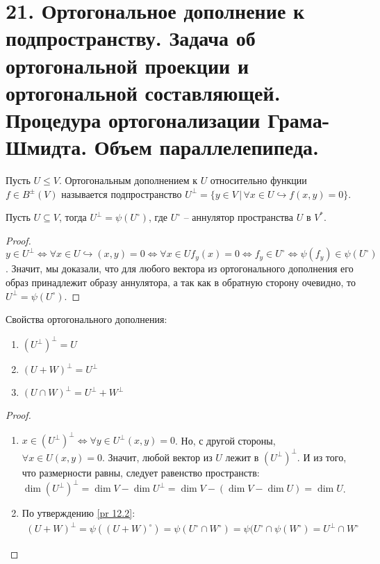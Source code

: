\section{21. Ортогональное дополнение к подпространству. Задача об ортогональной проекции и ортогональной составляющей. Процедура ортогонализации Грама-Шмидта. Объем параллелепипеда.}

\begin{definition}
    Пусть $U \leq V$. Ортогональным дополнением к $U$ относительно функции $f \in B^{\pm}(V)$ 
    называется подпространство $U^{\perp} = \{y \in V \,\vert \, \forall x \in U \hookrightarrow 
    f(x, y) = 0\}$.
\end{definition}

\begin{proposition}
\label{pr 12.2}
    Пусть $U \subseteq V$, тогда $U^{\perp} = \psi (U^{\circ})$, где $U^{\circ}$ -- аннулятор пространства $U$ в $V^*$.
\end{proposition}

\begin{proof}
    $y \in U^{\perp} \Leftrightarrow \forall x \in U \hookrightarrow (x, y) = 0 \Leftrightarrow \forall x \in U f_y(x) = 0 \Leftrightarrow f_y \in U^{\circ} \Leftrightarrow \psi(f_y) \in \psi(U^{\circ})$. Значит, мы доказали, что для любого вектора из ортогонального дополнения его образ принадлежит образу аннулятора, а так как в обратную сторону очевидно, то $U^{\perp} = \psi(U^{\circ})$.
\end{proof}

\begin{proposition}
    Свойства ортогонального дополнения:
    \begin{enumerate}
        \item $(U^{\perp})^{\perp} = U$
        \item $(U + W)^{\perp} = U^{\perp}$
        \item $(U \cap W)^{\perp} = U^{\perp} + W^{\perp}$
    \end{enumerate}
\end{proposition}

\begin{proof}
    \begin{enumerate}
        \item $x \in (U^{\perp})^{\perp} \Leftrightarrow \forall y \in U^{\perp} (x, y) = 0$. Но, с другой стороны, $\forall x \in U (x, y) = 0$. Значит, любой вектор из $U$ лежит в $(U^{\perp})^{\perp}$. И из того, что размерности равны, следует равенство пространств: $\dim (U^{\perp})^{\perp} = \dim V - \dim U^{\perp} = \dim V - (\dim V - \dim U) = \dim U$.
        \item По утверждению \ref{pr 12.2}: 
        \begin{gather*}
            (U + W)^{\perp} = \psi((U + W)^{\circ}) = \psi(U^{\circ} \cap W^{\circ}) = \psi(U^{\circ} \cap \psi(W^{\circ}) = U^{\perp} \cap W^{\circ}
        \end{gather*}
    \end{enumerate}
\end{proof}

